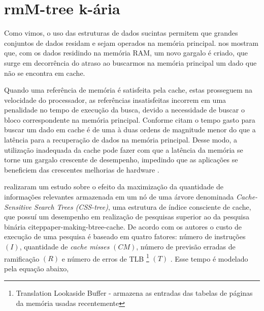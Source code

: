 



\section{rmM-tree k-ária}

Como vimos, o uso das estruturas de dados sucintas permitem que grandes conjuntos de dados residam e sejam operados na memória principal.  \citet{paper-effect-node-size-cache-b-trees} nos mostram que, com os  dados residindo na memória RAM, um novo gargalo é criado, que surge em decorrência do atraso ao buscarmos na memória principal um dado que não se encontra em cache. 

Quando uma referência de memória é satisfeita pela cache, estas prosseguem na velocidade do processador, as referências insatisfeitas incorrem em uma penalidade no tempo de execução da busca, devido a necessidade de buscar o bloco correspondente na memória principal. Conforme citam \citet{paper-effect-node-size-cache-b-trees} o tempo gasto para buscar um dado em cache é de uma à duas ordens de magnitude menor do que a latência para a recuperação de dados na memória principal. Desse modo, a utilização inadequada da cache pode fazer com que a latência da memória se torne um gargalo crescente de desempenho, impedindo que as aplicações se beneficiem das crescentes melhorias de hardware \citep{paper-making-btree-cache}.
 
\citet{paper-effect-node-size-cache-b-trees} realizaram um estudo sobre o efeito da maximização da quantidade de informações relevantes armazenada em um nó de uma árvore denominada \textit{Cache-Sensitive Search Trees (CSS-tree)}, uma estrutura de índice consciente de cache, que possuí um desempenho em realização de pesquisas superior ao da pesquisa binária citep{paper-making-btree-cache}. De acordo com os autores o custo de execução de uma pesquisa é baseado em quatro fatores: número de instruções $(I)$, quantidade de \textit{cache misses} $(CM)$, número de previsão  erradas de ramificação $(R)$ e número de erros de TLB \footnote{ Translation Lookaside Buffer  - armazena as entradas das tabelas de páginas da memória usadas recentemente}  $(T)$ \citep{paper-effect-node-size-cache-b-trees}.  Esse tempo é modelado pela equação abaixo,


